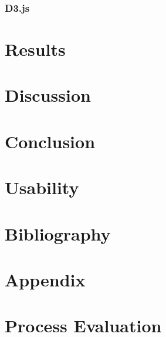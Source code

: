 \documentclass[a4paper,12pt]{article}
\begin{document}
\subsubsection{D3.js} %


\section{Results}

\section{Discussion}

\section{Conclusion}

\section{Usability}

\section{Bibliography}

\section{Appendix}

\section{Process Evaluation}
\end{document}
